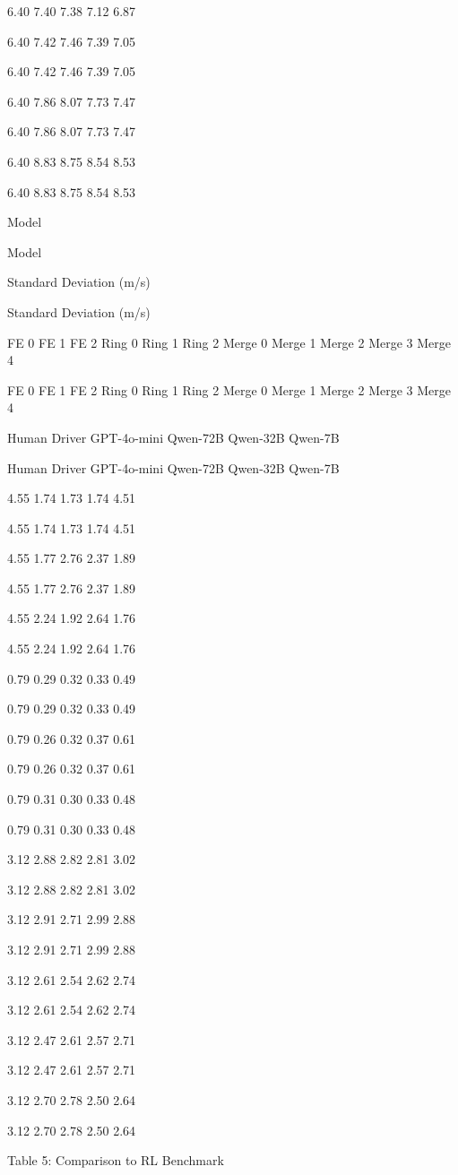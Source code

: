 \documentclass[12pt]{article}
\begin{document}
6.40
7.40
7.38
7.12
6.87


6.40
7.42
7.46
7.39
7.05


6.40
7.42
7.46
7.39
7.05


6.40
7.86
8.07
7.73
7.47


6.40
7.86
8.07
7.73
7.47


6.40
8.83
8.75
8.54
8.53


6.40
8.83
8.75
8.54
8.53


Model


Model


Standard Deviation (m/s)


Standard Deviation (m/s)


FE 0 FE 1 FE 2 Ring 0 Ring 1 Ring 2 Merge 0 Merge 1 Merge 2 Merge 3 Merge 4


FE 0 FE 1 FE 2 Ring 0 Ring 1 Ring 2 Merge 0 Merge 1 Merge 2 Merge 3 Merge 4


Human Driver
GPT-4o-mini
Qwen-72B
Qwen-32B
Qwen-7B


Human Driver
GPT-4o-mini
Qwen-72B
Qwen-32B
Qwen-7B


4.55
1.74
1.73
1.74
4.51


4.55
1.74
1.73
1.74
4.51


4.55
1.77
2.76
2.37
1.89


4.55
1.77
2.76
2.37
1.89


4.55
2.24
1.92
2.64
1.76


4.55
2.24
1.92
2.64
1.76


0.79
0.29
0.32
0.33
0.49


0.79
0.29
0.32
0.33
0.49


0.79
0.26
0.32
0.37
0.61


0.79
0.26
0.32
0.37
0.61


0.79
0.31
0.30
0.33
0.48


0.79
0.31
0.30
0.33
0.48


3.12
2.88
2.82
2.81
3.02


3.12
2.88
2.82
2.81
3.02


3.12
2.91
2.71
2.99
2.88


3.12
2.91
2.71
2.99
2.88


3.12
2.61
2.54
2.62
2.74


3.12
2.61
2.54
2.62
2.74


3.12
2.47
2.61
2.57
2.71


3.12
2.47
2.61
2.57
2.71


3.12
2.70
2.78
2.50
2.64


3.12
2.70
2.78
2.50
2.64


Table 5: Comparison to RL Benchmark
\end{document}

